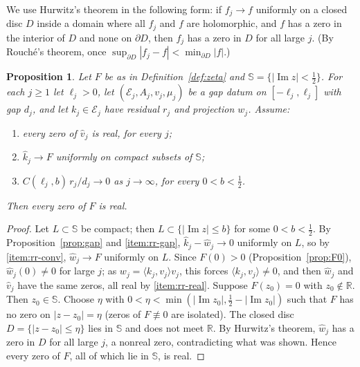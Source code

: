 \documentclass[11pt]{amsart}
\theoremstyle{plain}
\newtheorem{proposition}[theorem]{Proposition}
\theoremstyle{definition}
\theoremstyle{remark}
\numberwithin{equation}{section}
\newcommand{\R}{\mathbb{R}}
\DeclareMathOperator{\Ima}{Im}
\renewcommand{\Im}{\Ima}
\begin{document}
We use Hurwitz's theorem in the following form: if $f_j\to f$
uniformly on a closed disc $D$ inside a domain where all $f_j$ and $f$
are holomorphic, and $f$ has a zero in the interior of $D$ and none on
$\partial D$, then $f_j$ has a zero in $D$ for all large $j$. (By
Rouch\'e's theorem, once $\sup_{\partial D}|f_j-f|<\min_{\partial
D}|f|$.)

\begin{proposition}\label{prop:rouche-route}
Let $F$ be as in Definition~\ref{def:zeta} and
$\mathbb S=\{|\Im z|<\tfrac12\}$.
For each $j\ge1$ let $\ell_j>0$, let $(\mathcal E_j,A_j,v_j,\mu_j)$ be a
gap datum on $[-\ell_j,\ell_j]$ with gap $d_j$, and let
$k_j\in\mathcal E_j$ have residual $r_j$ and projection $w_j$. Assume:
\begin{enumerate}[label=(\alph*)]
\item\label{item:rr-real} every zero of $\widehat v_j$ is real, for
  every $j$;
\item\label{item:rr-conv} $\widehat k_j\to F$ uniformly on compact
  subsets of $\mathbb S$;
\item\label{item:rr-gap} $C(\ell_j,b)\,r_j/d_j\to0$ as $j\to\infty$,
  for every $0<b<\tfrac12$.
\end{enumerate}
Then every zero of $F$ is real.
\end{proposition}

\begin{proof}
Let $L\subset\mathbb S$ be compact; then $L\subset\{|\Im z|\le b\}$
for some $0<b<\tfrac12$. By Proposition~\ref{prop:gap} and
\ref{item:rr-gap}, $\widehat k_j-\widehat w_j\to0$ uniformly on $L$,
so by \ref{item:rr-conv}, $\widehat w_j\to F$ uniformly on $L$. Since
$F(0)>0$ (Proposition~\ref{prop:F0}), $\widehat w_j(0)\ne0$ for large
$j$; as $w_j=\langle k_j,v_j\rangle v_j$, this forces
$\langle k_j,v_j\rangle\ne0$, and then $\widehat w_j$ and $\widehat v_j$
have the same zeros, all real by \ref{item:rr-real}. Suppose $F(z_0)=0$
with $z_0\notin\R$. Then $z_0\in\mathbb S$. Choose $\eta$ with
$0<\eta<\min(|\Im z_0|,\tfrac12-|\Im z_0|)$ such that $F$ has no zero on
$|z-z_0|=\eta$ (zeros of $F\not\equiv0$ are isolated). The closed disc
$D=\{|z-z_0|\le\eta\}$ lies in $\mathbb S$ and does not meet $\R$. By Hurwitz's
theorem, $\widehat w_j$ has a zero in $D$ for all large $j$, a nonreal
zero, contradicting what was shown. Hence every zero of $F$, all of
which lie in $\mathbb S$, is real.
\end{proof}
\end{document}
